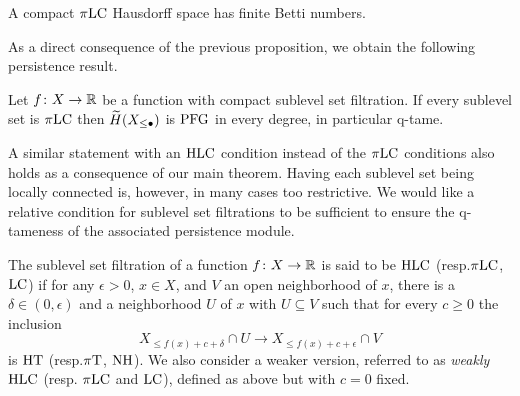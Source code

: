 \begin{prop}[{\citet[p.~109]{MR0007094}}]
	A compact $\pi\mathrm{LC}$ Hausdorff space has finite Betti numbers.
\end{prop}



As a direct consequence of the previous proposition, we obtain the following persistence result.

\begin{cor}
	Let $f \colon X \to \mathbb{R}$ be a function with compact sublevel set filtration. If every sublevel set is $\pi\mathrm{LC}$ then $\widetilde{H} (X_{\leq \bullet})$ is $\mathrm{PFG}$ in every degree, in particular q-tame.
\end{cor}

A similar statement with an $\mathrm{HLC}$ condition instead of the $\pi\mathrm{LC}$ conditions also holds as a consequence of our main theorem. Having each sublevel set being locally connected is, however, in many cases too restrictive.
We would like a relative condition for sublevel set filtrations to be sufficient to ensure the q-tameness of the associated persistence module.

\begin{defi} \label{defi:local_connectedness_filtrations}
	The sublevel set filtration of a function $f \colon X \to \mathbb{R}$ is said to be $\mathrm{HLC}$ (resp.\@ $\pi\mathrm{LC}$, $\mathrm{LC}$) if for any $\epsilon > 0$, $x \in X$, and $V$ an open neighborhood of $x$, there is a $\delta \in (0, \epsilon)$ and a neighborhood $U$ of $x$ with $U \subseteq V$ such that for every $c \geq 0$ the inclusion
	\begin{equation*}
	X_{\leq f(x) + c + \delta} \cap U \to X_{\leq f(x) + c + \epsilon} \cap V
	\end{equation*}
	is $\mathrm{HT}$ (resp.\@ $\pi\mathrm{T}$, $\mathrm{NH}$).
	We also consider a weaker version, referred to as \textit{weakly} $\mathrm{HLC}$ (resp. $\pi\mathrm{LC}$ and $\mathrm{LC}$), defined as above but with $c = 0$ fixed.
\end{defi}

